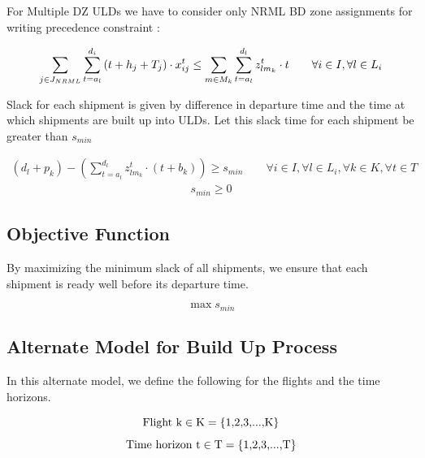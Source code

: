 \documentclass[11pt,a4paper,fleqn]{article}
\begin{document}
For Multiple DZ ULDs we have to consider only NRML BD zone assignments for writing precedence constraint : 

\begin{align}
 \sum_{j \in J_{NRML}}\sum_{t=a_{l}}^{d_{i}}{\color{black}{(t + h_{j} + T_{j})}} \cdot x_{ij}^t  \le \sum_{m \in M_{k}}\sum_{t=a_{l}}^{d_{l}}z_{lm_{k}}^t \cdot t \qquad \forall i \in I , \forall l \in L_{i}
\end{align}

Slack for each shipment is given by difference in departure time and the time at which shipments are built up into ULDs. Let this slack time for each shipment be greater than ${s_{min}}$

\begin{align}
 ( d_{l} + p_{k}) - (\sum_{t=a_{l}}^{d_{l}}z_{lm_{k}}^t \cdot (t + b_{k}) )  \ge s_{min} \qquad \forall i \in I, \forall l \in L_{i}, \forall k \in K, \forall t \in T
\end{align}
\begin{align}
s_{min} \ge 0
\end{align}

\subsection{Objective Function}
\label{sec:objBUZone}

By maximizing the minimum slack of all shipments, we ensure that each shipment is ready well before its departure time.

\begin{equation*}
\max s_{min}
\end{equation*}


\subsection{Alternate Model for Build Up Process}
\label{sec:ParamBUZone}

In this alternate model, we define the following for the flights and the time horizons. 

\begin{equation*} ${\color{black} Flight k}$ {}  \in {}  ${\color{black}K}$ {} = {} ${\color{black}\{1,2,3,...,K\}}$  \end{equation*} 
\begin{equation*} ${\color{black} Time horizon t}$ {}  \in {}  ${\color{black}T}$ {} = {} ${\color{black}\{1,2,3,...,T\}}$ \end{equation*} 
\end{document}
